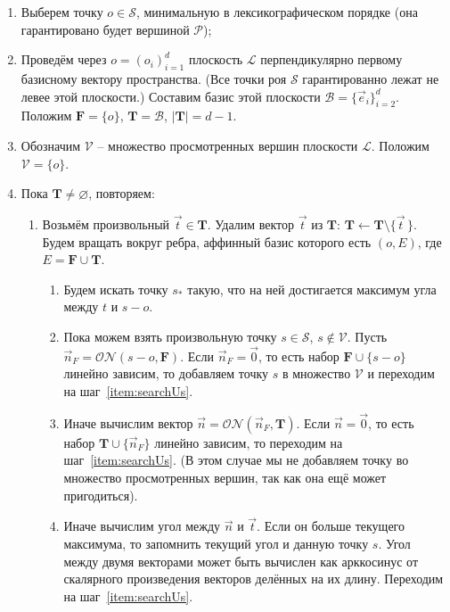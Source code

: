\documentclass[a4paper,12pt]{article}
\newcommand{\Swarm}{\mathcal{S}}              %
\newcommand{\Polyhedron}{\mathcal{P}}         %
\newcommand{\Basis}{\mathcal{B}}              %
\newcommand{\Viewed}{\mathcal{V}}             %
\newcommand{\ZVec}{\vec 0}                    %
\newcommand{\set}[2][]{#1\{ #2 #1\}}                    %
\newcommand{\ONorm}[3][]{\mathcal{ON}#1( #2, #3 #1)} %
\newcommand{\TempVec}{\mathbf{T}}  %
\newcommand{\FinalVec}{\mathbf{F}} %
\newcommand{\Plane}{\mathcal{L}}           %
\renewcommand{\.}{\hspace{0.2ex}}
\begin{document}
    \begin{enumerate}
      \item Выберем точку $o \in \Swarm$, минимальную в лексикографическом порядке (она гарантировано будет вершиной $\Polyhedron$);


      \item Проведём через $o=(o_i)_{i = 1}^{d}$ плоскость $\Plane$ перпендикулярно первому базисному вектору пространства. (Все точки роя $\Swarm$ гарантированно лежат не левее этой плоскости.) Составим базис этой плоскости $\Basis = \set{\vec e_i}_{i=2}^d$. Положим $\FinalVec = \set{o}$, $\TempVec = \Basis$, $|\TempVec| = d-1$.


      \item Обозначим $\Viewed$ -- множество просмотренных вершин плоскости $\Plane$. Положим $\Viewed =\set{o}$.


      \item Пока $\TempVec \neq \varnothing$, повторяем:


      \begin{enumerate}
        \item Возьмём произвольный $\vec t \in \TempVec$. Удалим вектор $\vec t$ из $\TempVec$: $\TempVec \leftarrow \TempVec \setminus \set{\vec t \,}$. Будем вращать вокруг ребра, аффинный базис которого есть $(o, E)$, где $E = \FinalVec \cup \TempVec$.


        \begin{enumerate}
          \item Будем искать точку $s_*$ такую, что на ней достигается максимум угла между $t$ и $s - o$.


          \item Пока можем взять произвольную точку $s \in \Swarm$, $s \notin \Viewed$. Пусть $\vec n_F = \ONorm{s - o}{\FinalVec}$. Если $\vec n_F = \ZVec$, то есть набор $\FinalVec \cup \set{s - o}$ линейно зависим, то добавляем точку $s$ в множество $\Viewed$ и переходим на шаг~\ref{item:searchUs}.
          \label{item:searchUs}


          \item Иначе вычислим вектор $\vec n = \ONorm{\vec n_F}{\TempVec}$. Если $\vec n = \ZVec$, то есть набор $\TempVec \cup \set{\vec n_F}$ линейно зависим, то переходим на шаг~\ref{item:searchUs}. (В этом случае мы не добавляем точку во множество просмотренных вершин, так как она ещё может пригодиться).


          \item Иначе вычислим угол между $\vec n$ и $\vec t$. Если он больше текущего максимума, то запомнить текущий угол и данную точку $s$. Угол между двумя векторами может быть вычислен как арккосинус от скалярного произведения векторов делённых на их длину. Переходим на шаг~\ref{item:searchUs}.
        \end{enumerate}



\end{enumerate}
\end{enumerate}
\end{document}
